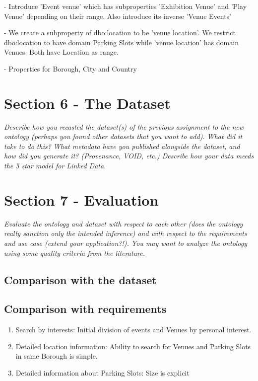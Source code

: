 \documentclass[runningheads,a4paper]{../../StyleFiles/llncs}
\begin{document}
- Introduce 'Event venue' which has subproperties 'Exhibition Venue' and 'Play Venue' depending on their range. Also introduce its inverse 'Venue Events'

- We create a subproperty of dbo:location to be 'venue location'. We restrict dbo:location to have domain Parking Slots while 'venue location' has domain Venues. Both have Location as range.

- Properties for Borough, City and Country


\section{Section 6 - The Dataset}
\textit{Describe how you recasted the dataset(s) of the previous assignment to the new ontology (perhaps you found other datasets that you want to add). What did it take to do this? What metadata have you published alongside the dataset, and how did you generate it? (Provenance, VOID, etc.) Describe how your data meeds the 5 star model for Linked Data.}


\section{Section 7 - Evaluation}
\textit{Evaluate the ontology and dataset with respect to each other (does the ontology really sanction only the intended inference) and with respect to the requirements and use case (extend your application?!). You may want to analyze the ontology using some quality criteria from the literature.}

\subsection{Comparison with the dataset}

\subsection{Comparison with requirements}
\begin{enumerate}
	\item Search by interests: Initial division of events and Venues by personal interest.
	\item Detailed location information: Ability to search for Venues and Parking Slots in same Borough is simple.
	\item Detailed information about Parking Slots: Size is explicit
\end{enumerate}
\end{document}
